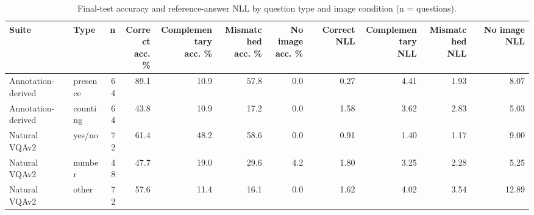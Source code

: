 \begin{table}[t]
\centering
\small
\caption{Final-test accuracy and reference-answer NLL by question type and image condition (n = questions).}
\label{tab:t2-bytype}
\begin{tabular}{llrrrrrrrrr}
\toprule
Suite & Type & n & \makecell{Correct\\acc. \%} & \makecell{Complementary\\acc. \%} & \makecell{Mismatched\\acc. \%} & \makecell{No image\\acc. \%} & Correct NLL & \makecell{Complementary\\NLL} & \makecell{Mismatched\\NLL} & No image NLL \\
\midrule
Annotation-derived & presence & 64 & 89.1 & 10.9 & 57.8 & 0.0 & 0.27 & 4.41 & 1.93 & 8.07 \\
Annotation-derived & counting & 64 & 43.8 & 10.9 & 17.2 & 0.0 & 1.58 & 3.62 & 2.83 & 5.03 \\
\midrule
Natural VQAv2 & yes/no & 72 & 61.4 & 48.2 & 58.6 & 0.0 & 0.91 & 1.40 & 1.17 & 9.00 \\
Natural VQAv2 & number & 48 & 47.7 & 19.0 & 29.6 & 4.2 & 1.80 & 3.25 & 2.28 & 5.25 \\
Natural VQAv2 & other & 72 & 57.6 & 11.4 & 16.1 & 0.0 & 1.62 & 4.02 & 3.54 & 12.89 \\
\bottomrule
\end{tabular}
\end{table}
